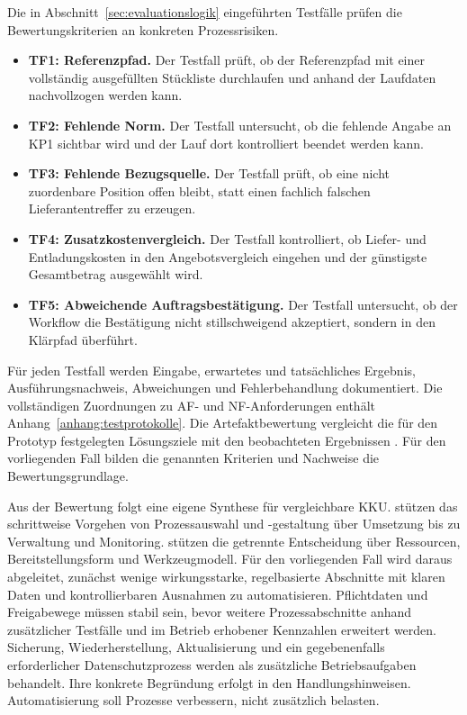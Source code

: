 \documentclass[a4paper,12pt]{article}
\begin{document}
Die in Abschnitt~\ref{sec:evaluationslogik} eingeführten Testfälle prüfen die Bewertungskriterien an konkreten Prozessrisiken.

\begin{itemize}
    \item \textbf{TF1: Referenzpfad.} Der Testfall prüft, ob der Referenzpfad mit einer vollständig ausgefüllten Stückliste durchlaufen und anhand der Laufdaten nachvollzogen werden kann.
    \item \textbf{TF2: Fehlende Norm.} Der Testfall untersucht, ob die fehlende Angabe an KP1 sichtbar wird und der Lauf dort kontrolliert beendet werden kann.
    \item \textbf{TF3: Fehlende Bezugsquelle.} Der Testfall prüft, ob eine nicht zuordenbare Position offen bleibt, statt einen fachlich falschen Lieferantentreffer zu erzeugen.
    \item \textbf{TF4: Zusatzkostenvergleich.} Der Testfall kontrolliert, ob Liefer- und Entladungskosten in den Angebotsvergleich eingehen und der günstigste Gesamtbetrag ausgewählt wird.
    \item \textbf{TF5: Abweichende Auftragsbestätigung.} Der Testfall untersucht, ob der Workflow die Bestätigung nicht stillschweigend akzeptiert, sondern in den Klärpfad überführt.
\end{itemize}

Für jeden Testfall werden Eingabe, erwartetes und tatsächliches Ergebnis, Ausführungsnachweis, Abweichungen und Fehlerbehandlung dokumentiert. Die vollständigen Zuordnungen zu AF- und NF-Anforderungen enthält Anhang~\ref{anhang:testprotokolle}. Die Artefaktbewertung vergleicht die für den Prototyp festgelegten Lösungsziele mit den beobachteten Ergebnissen \parencite{peffers_design_2007}. Für den vorliegenden Fall bilden die genannten Kriterien und Nachweise die Bewertungsgrundlage.

Aus der Bewertung folgt eine eigene Synthese für vergleichbare KKU. \Textcite{moreira_methodology_2025} stützen das schrittweise Vorgehen von Prozessauswahl und -gestaltung über Umsetzung bis zu Verwaltung und Monitoring. \Textcite{asatiani_deciding_2023} stützen die getrennte Entscheidung über Ressourcen, Bereitstellungsform und Werkzeugmodell. Für den vorliegenden Fall wird daraus abgeleitet, zunächst wenige wirkungsstarke, regelbasierte Abschnitte mit klaren Daten und kontrollierbaren Ausnahmen zu automatisieren. Pflichtdaten und Freigabewege müssen stabil sein, bevor weitere Prozessabschnitte anhand zusätzlicher Testfälle und im Betrieb erhobener Kennzahlen erweitert werden. Sicherung, Wiederherstellung, Aktualisierung und ein gegebenenfalls erforderlicher Datenschutzprozess werden als zusätzliche Betriebsaufgaben behandelt. Ihre konkrete Begründung erfolgt in den Handlungshinweisen. Automatisierung soll Prozesse verbessern, nicht zusätzlich belasten.
\end{document}
